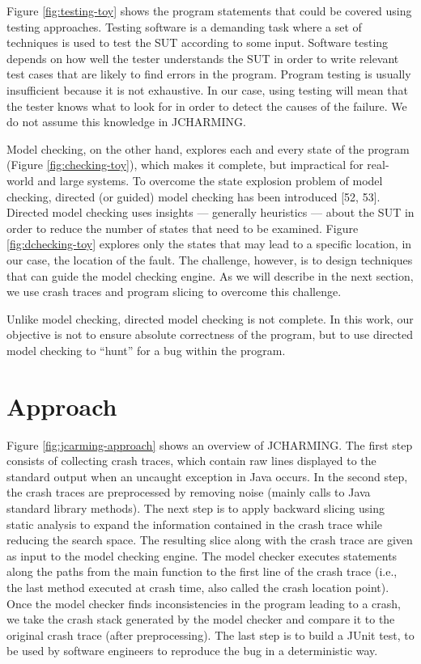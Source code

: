 \documentclass[12pt]{report}
\begin{document}
Figure \ref{fig:testing-toy} shows the program statements that could be
covered using testing approaches. Testing software is a demanding task
where a set of techniques is used to test the SUT according to some
input. Software testing depends on how well the tester understands the
SUT in order to write relevant test cases that are likely to find errors
in the program. Program testing is usually insufficient because it is
not exhaustive. In our case, using testing will mean that the tester
knows what to look for in order to detect the causes of the failure. We
do not assume this knowledge in JCHARMING.

Model checking, on the other hand, explores each and every state of the
program (Figure \ref{fig:checking-toy}), which makes it complete, but
impractical for real-world and large systems. To overcome the state
explosion problem of model checking, directed (or guided) model checking
has been introduced {[}52, 53{]}. Directed model checking uses insights
--- generally heuristics --- about the SUT in order to reduce the number
of states that need to be examined. Figure \ref{fig:dchecking-toy}
explores only the states that may lead to a specific location, in our
case, the location of the fault. The challenge, however, is to design
techniques that can guide the model checking engine. As we will describe
in the next section, we use crash traces and program slicing to overcome
this challenge.

Unlike model checking, directed model checking is not complete. In this
work, our objective is not to ensure absolute correctness of the
program, but to use directed model checking to ``hunt'' for a bug within
the program.

\section{\texorpdfstring{Approach\label{sec:jcharming}}{Approach}}\label{approach-4}

Figure \ref{fig:jcarming-approach} shows an overview of JCHARMING. The
first step consists of collecting crash traces, which contain raw lines
displayed to the standard output when an uncaught exception in Java
occurs. In the second step, the crash traces are preprocessed by
removing noise (mainly calls to Java standard library methods). The next
step is to apply backward slicing using static analysis to expand the
information contained in the crash trace while reducing the search
space. The resulting slice along with the crash trace are given as input
to the model checking engine. The model checker executes statements
along the paths from the main function to the first line of the crash
trace (i.e., the last method executed at crash time, also called the
crash location point). Once the model checker finds inconsistencies in
the program leading to a crash, we take the crash stack generated by the
model checker and compare it to the original crash trace (after
preprocessing). The last step is to build a JUnit test, to be used by
software engineers to reproduce the bug in a deterministic way.
\end{document}
